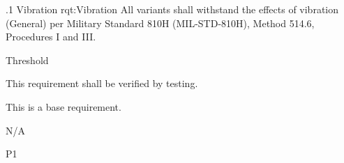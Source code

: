 \ONERQMTVKSA
{\RqtNumberBase.1}
{Vibration}
{rqt:Vibration}
{All \ThisSystem variants shall withstand the effects of vibration (General) per Military Standard 810H (MIL-STD-810H), Method 514.6, Procedures I and III.}
{
	\item [Phase 1] Threshold
}
{This requirement shall be verified by testing.}
{
\item [N/A] This is a base requirement.
}
{
	\item N/A
}
{P1}
